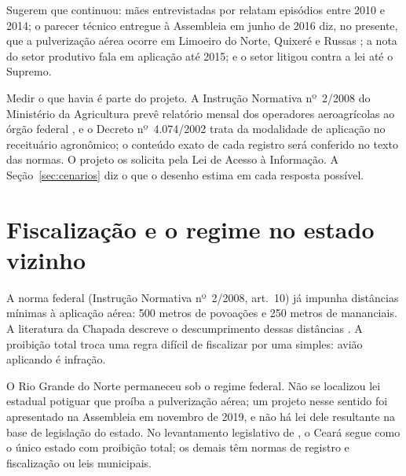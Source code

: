 Sugerem que continuou: mães entrevistadas por  relatam episódios entre 2010 e 2014; o parecer técnico
entregue à Assembleia em junho de 2016 diz, no presente, que a pulverização
aérea ocorre em Limoeiro do Norte, Quixeré e Russas \cite{tramas2016parecer};
a nota do setor produtivo fala em aplicação até 2015; e o setor litigou contra
a lei até o Supremo.

Medir o que havia é parte do projeto. A Instrução Normativa nº~2/2008 do
Ministério da Agricultura prevê relatório mensal dos operadores aeroagrícolas
ao órgão federal \cite{olivete2025}, e o Decreto nº~4.074/2002 trata da
modalidade de aplicação no receituário agronômico; o conteúdo exato de cada
registro será conferido no texto das normas. O projeto os solicita pela Lei de
Acesso à Informação. A Seção~\ref{sec:cenarios}
diz o que o desenho estima em cada resposta possível.

\section{Fiscalização e o regime no estado vizinho}

A norma federal (Instrução Normativa nº~2/2008, art.~10) já impunha distâncias
mínimas à aplicação aérea: 500 metros de povoações e 250 metros de mananciais. A literatura da Chapada descreve o
descumprimento dessas distâncias \cite{teixeira2011rebulico,
tramas2016parecer}. A proibição total troca uma regra difícil de fiscalizar por
uma simples: avião aplicando é infração.

O Rio Grande do Norte permaneceu sob o regime federal. Não se localizou lei
estadual potiguar que proíba a pulverização aérea; um projeto nesse sentido foi
apresentado na Assembleia em novembro de 2019, e não há lei dele resultante na
base de legislação do estado. No
levantamento legislativo de , o Ceará segue como o único
estado com proibição total; os demais têm normas de registro e fiscalização ou
leis municipais.
